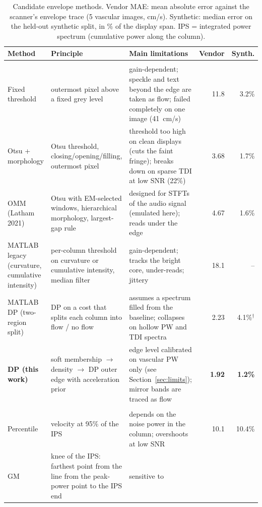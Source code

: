 \documentclass[10pt,a4paper]{article}
\begin{document}
\begin{table}[!htbp]
\centering\footnotesize
\caption{Candidate envelope methods. Vendor MAE: mean absolute error against the scanner's envelope trace
(5 vascular images, cm/s). Synthetic: median error on the held-out synthetic split, in \% of the display span.
IPS = integrated power spectrum (cumulative power along the column).}
\label{tab:candidates}
\setlength{\tabcolsep}{4pt}
\begin{tabularx}{\linewidth}{@{}>{\raggedright\arraybackslash}p{2.4cm}LLrr@{}}
\toprule
Method & Principle & Main limitations & Vendor & Synth. \\ \midrule
{} \\
Fixed threshold & outermost pixel above a fixed grey level & gain-dependent; speckle and text beyond the
edge are taken as flow; failed completely on one image (41~cm/s) & 11.8 & 3.2\% \\
Otsu + morphology & Otsu threshold, closing/opening/filling, outermost pixel & threshold too high on clean
displays (cuts the faint fringe); breaks down on sparse TDI at low SNR (22\%) & 3.68 & 1.7\% \\
OMM (Latham 2021) \cite{latham} & Otsu with EM-selected windows, hierarchical morphology, largest-gap rule &
designed for STFTs of the audio signal (emulated here); reads under the edge & 4.67 & 1.6\% \\
MATLAB legacy (curvature, cumulative intensity) & per-column threshold on curvature or cumulative intensity, median filter &
gain-dependent; tracks the bright core, under-reads; jittery & 18.1 & -- \\
MATLAB DP (two-region split) & DP on a cost that splits each column into flow / no flow &
assumes a spectrum filled from the baseline; collapses on hollow PW and TDI spectra & 2.23 & 4.1\%$^\dagger$ \\
\textbf{DP (this work)} & soft membership $\to$ density $\to$ DP outer edge with acceleration prior &
edge level calibrated on vascular PW only (see Section~\ref{sec:limits}); mirror bands are traced as flow & \textbf{1.92} & \textbf{1.2\%} \\
\midrule
{} \\
Percentile \cite{marasek} & velocity at 95\% of the IPS & depends on the noise power in the column;
overshoots at low SNR & 10.1 & 10.4\% \\
GM \cite{marasek} & knee of the IPS: farthest point from the line from the peak-power point to the IPS end & sensitive to

\end{tabularx}
\end{table}
\end{document}
